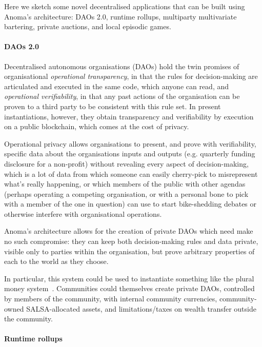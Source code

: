 \documentclass[
    9pt,            %
    commun,        %
    affiltop,       %
]{art}
\begin{document}
Here we sketch some novel decentralised applications that can be built
using Anoma's architecture: DAOs 2.0, runtime rollups,
multiparty multivariate bartering, private auctions, and local episodic
games.

\paragraph{DAOs 2.0}\label{daos-20}

Decentralised autonomous organisations (DAOs) hold the twin promises of
organisational \emph{operational transparency}, in that the rules for
decision-making are articulated and executed in the same code, which
anyone can read, and \emph{operational verifiability}, in that any past
actions of the organisation can be proven to a third party to be
consistent with this rule set. In present instantiations, however, they
obtain transparency and verifiability by execution on a public
blockchain, which comes at the cost of privacy.

Operational privacy allows organisations to present, and prove with
verifiability, specific data about the organisations inputs and outputs
(e.g. quarterly funding disclosure for a non-profit) without revealing
every aspect of decision-making, which is a lot of data from which
someone can easily cherry-pick to misrepresent what's
really happening, or which members of the public with other agendas
(perhaps operating a competing organisation, or with a personal bone to
pick with a member of the one in question) can use to start
bike-shedding debates or otherwise interfere with organisational
operations.

Anoma's architecture allows for the creation of private
DAOs which need make no such compromise: they can keep both
decision-making rules and data private, visible only to parties within
the organisation, but prove arbitrary properties of each to the world as
they choose.

In particular, this system could be used to instantiate something like
the plural money system~\cite{pluralmoney}. Communities could themselves
create private DAOs, controlled by members of the community, with
internal community currencies, community-owned SALSA-allocated assets,
and limitations/taxes on wealth transfer outside the community.

\paragraph{Runtime rollups}\label{runtime-rollups}
\end{document}
